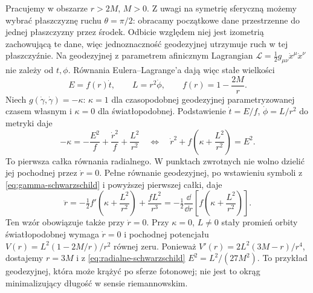 \begin{przyklad}
\label{prz:geodezyjne-schwarzschild}
Pracujemy w obszarze $r>2M$, $M>0$. Z uwagi na symetrię
sferyczną możemy wybrać płaszczyznę ruchu $\theta=\pi/2$:
obracamy początkowe dane przestrzenne do jednej płaszczyzny
przez środek. Odbicie względem niej jest izometrią
zachowującą te dane, więc jednoznaczność geodezyjnej
utrzymuje ruch w tej płaszczyźnie.
Na geodezyjnej z parametrem afinicznym
Lagrangian $\mathcal L=\tfrac12g_{\mu\nu}
\dot x^\mu\dot x^\nu$ nie zależy od $t,\phi$.
Równania Eulera--Lagrange'a dają więc
stałe wielkości
\begin{equation}\label{eq:stale-schwarzschild}
 E=f(r)\dot t,\qquad L=r^2\dot\phi,
 \qquad f(r)=1-\frac{2M}{r}.
\end{equation}
Niech $g(\dot\gamma,\dot\gamma)=-\kappa$:
$\kappa=1$ dla czasopodobnej geodezyjnej
parametryzowanej czasem własnym i $\kappa=0$
dla światłopodobnej. Podstawienie
$\dot t=E/f$, $\dot\phi=L/r^2$ do metryki daje
\begin{equation}\label{eq:radialne-schwarzschild}
 -\kappa=-\frac{E^2}{f}+\frac{\dot r^2}{f}
                   +\frac{L^2}{r^2}
 \quad\Longleftrightarrow\quad
 \dot r^2+f\left(\kappa+\frac{L^2}{r^2}\right)=E^2.
\end{equation}
To pierwsza całka równania radialnego. W punktach zwrotnych
nie wolno dzielić jej pochodnej przez $\dot r=0$.
Pełne równanie geodezyjnej, po wstawieniu symboli
z \eqref{eq:gamma-schwarzschild} i powyższej pierwszej całki, daje
\[
 \ddot r=-\tfrac12 f'\left(\kappa+\frac{L^2}{r^2}\right)
                  +\frac{fL^2}{r^3}
        =-\tfrac12\frac{\dd}{\dd r}
                    \left[f\left(\kappa+\frac{L^2}{r^2}\right)\right].
\]
Ten wzór obowiązuje także przy $\dot r=0$.
Przy $\kappa=0$, $L\ne0$ stały promień
orbity światłopodobnej wymaga $\dot r=0$
i pochodnej potencjału
$V(r)=L^2(1-2M/r)/r^2$ równej zeru.
Ponieważ
$V'(r)=2L^2(3M-r)/r^4$, dostajemy
$r=3M$ i z \eqref{eq:radialne-schwarzschild}
$E^2=L^2/(27M^2)$. To przykład geodezyjnej,
która może krążyć po sferze fotonowej;
nie jest to okrąg minimalizujący długość
w sensie riemannowskim.
\end{przyklad}

